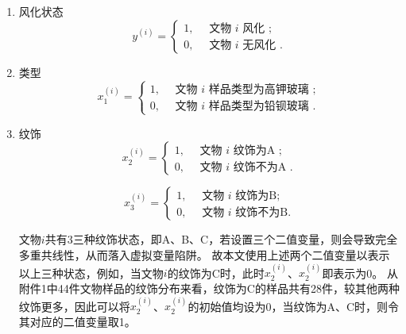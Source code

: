 \begin{enumerate}
\item 风化状态
\begin{equation}
y^{(i)}=\left\{\begin{array}{l}
1, \quad \text { 文物 } i \text { 风化 }; \\
0, \quad \text { 文物 } i \text { 无风化 }.
\end{array}\right.
\end{equation}

\item 类型
\begin{equation}
	x_{1}^{(i)}=\left\{\begin{array}{l}
1, \quad \text { 文物 } i \text { 样品类型为高钾玻璃 }; \\
0, \quad \text { 文物 } i \text { 样品类型为铅钡玻璃 }.
\end{array}\right.
\end{equation}

\item 纹饰
\begin{equation}
	x_{2}^{(i)}=\left\{\begin{array}{l}
1,\quad \text { 文物 } i \text { 纹饰为A };  \\
0,\quad \text { 文物 } i \text { 纹饰不为A }.
\end{array}\right.
\end{equation}

\begin{equation}
	x_{3}^{(i)}=\left\{\begin{array}{l}
1,\quad \text { 文物 } i \text { 纹饰为B};  \\
0,\quad \text { 文物 } i \text { 纹饰不为B}.
\end{array}\right.
\end{equation}

文物$i$共有3三种纹饰状态，即A、B、C，若设置三个二值变量，则会导致完全多重共线性，从而落入虚拟变量陷阱\cite{伍德里奇2014计量经济学导论}。
故本文使用上述两个二值变量以表示以上三种状态，例如，当文物$i$的纹饰为C时，此时$x_{2}^{(i)}$、$x_{2}^{(i)}$即表示为0。
从附件1中44件文物样品的纹饰分布来看，纹饰为C的样品共有28件，较其他两种纹饰更多，因此可以将$x_{2}^{(i)}$、$x_{2}^{(i)}$的初始值均设为0，当纹饰为A、C时，则令其对应的二值变量取1。



\end{enumerate}




